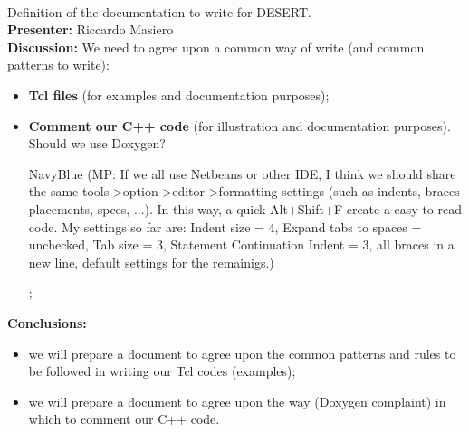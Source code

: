 \documentclass[11pt,journal,draftclsnofoot,onecolumn,twoside,letterpaper]{IEEEtran}
\newcommand{\MP}[1]{\begin{color}{NavyBlue} (MP: #1) \end{color}}
\theoremstyle{definition} \newtheorem{definition}[]{Definition}
\theoremstyle{theorem} \newtheorem{theorem}[]{Theorem}
\begin{document}
\ \\
  Definition of the documentation to write for DESERT.\\
{\bf Presenter:} Riccardo Masiero\\
{\bf Discussion:} 
We need to agree upon a common way of write (and common patterns to write):
\begin{itemize}
 \item {\bf Tcl files} (for examples and documentation purposes);
 \item {\bf Comment our C++ code} (for illustration and documentation purposes). Should we use Doxygen? \MP{If we all use Netbeans or other IDE, I think we should share the same tools->option->editor->formatting settings (such as indents, braces placements, spces, ...). In this way, a quick Alt+Shift+F create a easy-to-read code. My settings so far are: Indent size = 4, Expand tabs to spaces = unchecked, Tab size = 3, Statement Continuation Indent = 3, all braces in a new line, default settings for the remainigs.};
\end{itemize}
{\bf Conclusions:} 
\begin{itemize}
\item we will prepare a document to agree upon the common patterns and rules to be followed in writing our Tcl codes (examples);
\item we will prepare a document to agree upon the way (Doxygen complaint) in which to comment our C++ code.
\end{itemize}
 
\end{document}
